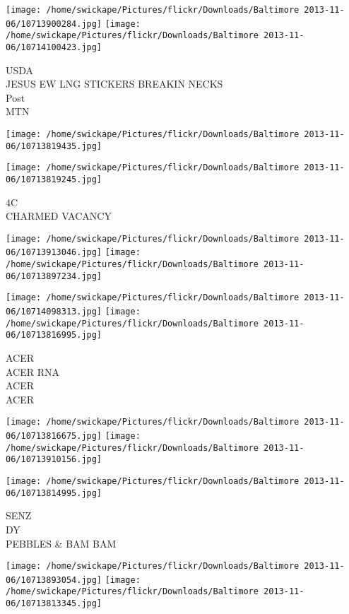 \documentclass[10pt,letterpaper]{article}
\begin{document}
\texttt{[image: /home/swickape/Pictures/flickr/Downloads/Baltimore 2013-11-06/10713900284.jpg]}
\texttt{[image: /home/swickape/Pictures/flickr/Downloads/Baltimore 2013-11-06/10714100423.jpg]}

USDA\\
JESUS EW LNG STICKERS BREAKIN NECKS\\
Post\\
MTN\\
\pagebreak

\texttt{[image: /home/swickape/Pictures/flickr/Downloads/Baltimore 2013-11-06/10713819435.jpg]}

\vspace{0.25in}
\texttt{[image: /home/swickape/Pictures/flickr/Downloads/Baltimore 2013-11-06/10713819245.jpg]}

4C\\
CHARMED VACANCY\\
\pagebreak

\texttt{[image: /home/swickape/Pictures/flickr/Downloads/Baltimore 2013-11-06/10713913046.jpg]}
\texttt{[image: /home/swickape/Pictures/flickr/Downloads/Baltimore 2013-11-06/10713897234.jpg]}

\texttt{[image: /home/swickape/Pictures/flickr/Downloads/Baltimore 2013-11-06/10714098313.jpg]}
\texttt{[image: /home/swickape/Pictures/flickr/Downloads/Baltimore 2013-11-06/10713816995.jpg]}

ACER\\
ACER RNA\\
ACER\\
ACER\\
\pagebreak

\texttt{[image: /home/swickape/Pictures/flickr/Downloads/Baltimore 2013-11-06/10713816675.jpg]}
\texttt{[image: /home/swickape/Pictures/flickr/Downloads/Baltimore 2013-11-06/10713910156.jpg]}

\vspace{0.25in}
\texttt{[image: /home/swickape/Pictures/flickr/Downloads/Baltimore 2013-11-06/10713814995.jpg]}

SENZ\\
DY\\
PEBBLES \& BAM BAM\\
\pagebreak

\texttt{[image: /home/swickape/Pictures/flickr/Downloads/Baltimore 2013-11-06/10713893054.jpg]}
\texttt{[image: /home/swickape/Pictures/flickr/Downloads/Baltimore 2013-11-06/10713813345.jpg]}
\end{document}
